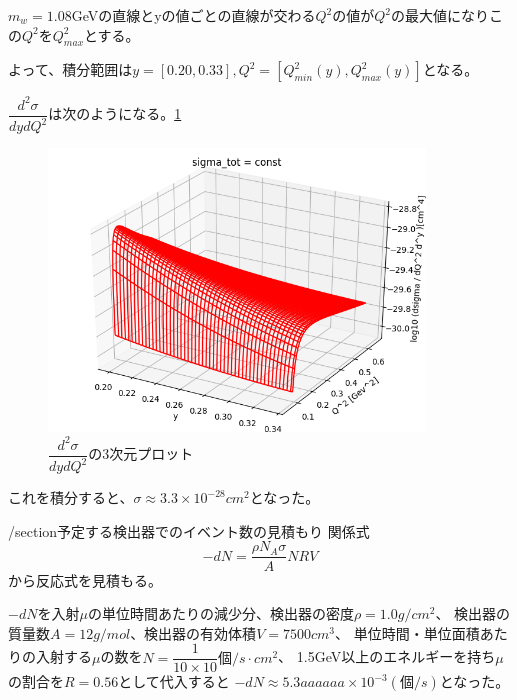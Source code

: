 $m_w = 1.08$GeVの直線とyの値ごとの直線が交わる$Q^2$の値が$Q^2$の最大値になりこの$Q^2$を$Q^2_{max}$とする。

よって、積分範囲は$y = [0.20, 0.33], Q^2 = [Q^2_{min}(y), Q^2_{max}(y)]$となる。

$\dfrac{d^2\sigma}{dydQ^2}$は次のようになる。\ref{fig:test7}

\begin{figure}[H]
    \centering
    \includegraphics[width=10cm]{img/integrate_flux_used_artile.png}
    \caption{$\dfrac{d^2\sigma}{dydQ^2}$の3次元プロット}
    \label{fig:test7}
\end{figure}

これを積分すると、$\sigma \approx 3.3 \times 10^{-28} cm^2$となった。

/section{予定する検出器でのイベント数の見積もり}
関係式
\begin{equation}
    -dN =\dfrac{\rho N_A \sigma }{A}NRV
\end{equation}
から反応式を見積もる。

$-dN$を入射$\mu$の単位時間あたりの減少分、検出器の密度$\rho = 1.0 g/cm^2$、
検出器の質量数$A = 12 g/mol$、検出器の有効体積$V = 7500cm^3$、
単位時間・単位面積あたりの入射する$\mu$の数を$N = \dfrac{1}{10\times 10} 個/s\cdot cm^2$、
1.5GeV以上のエネルギーを持ち$\mu$の割合を$R = 0.56$として代入すると
$-dN \approx 5.3aaaaaa \times 10^{-3}(個/s)$となった。